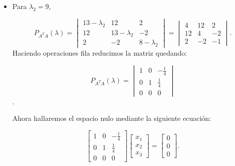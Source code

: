 \begin{frame}
	\begin{itemize}
		\item
		      Para $\lambda_{2}=9$,

		      \begin{equation*}
			      P_{A^{T}A}
			      \left(\lambda\right)=
			      \begin{vmatrix}
				      13 - \lambda_{2} & 12               & 2               \\
				      12               & 13 - \lambda_{2} & -2              \\
				      2                & -2               & 8 - \lambda_{2}
			      \end{vmatrix} =
			      \begin{vmatrix}
				      4  & 12 & 2  \\
				      12 & 4  & -2 \\
				      2  & -2 & -1
			      \end{vmatrix}.
		      \end{equation*}
		      Haciendo operaciones fila reducimos la matriz quedando:

		      \begin{equation*}
			      P_{A^{T}A}
			      \left(\lambda\right)=
			      \begin{vmatrix}
				      1 & 0 & -\frac{1}{4} \\
				      0 & 1 & \frac{1}{4}  \\
				      0 & 0 & 0
			      \end{vmatrix}
		      \end{equation*}.

		      Ahora hallaremos el espacio nulo mediante la siguiente ecuación:

		      \begin{equation*}
			      \begin{bmatrix}
				      1 & 0 & -\frac{1}{4} \\
				      0 & 1 & \frac{1}{4}  \\
				      0 & 0 & 0
			      \end{bmatrix}
			      \begin{bmatrix}
				      x_{1} \\
				      x_{2} \\
				      x_{3}
			      \end{bmatrix}=
			      \begin{bmatrix}
				      0 \\
				      0 \\
				      0
			      \end{bmatrix}.
		      \end{equation*}


\end{itemize}
\end{frame}
